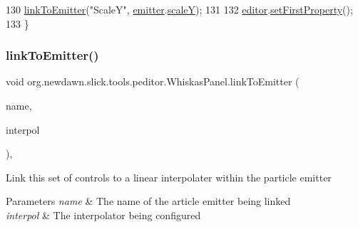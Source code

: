 \begin{DoxyCode}
130         \mbox{\hyperlink{classorg_1_1newdawn_1_1slick_1_1tools_1_1peditor_1_1_whiskas_panel_aa8fd4ce760ea12d13153842f6dc4c902}{linkToEmitter}}(\textcolor{stringliteral}{"ScaleY"}, \mbox{\hyperlink{classorg_1_1newdawn_1_1slick_1_1tools_1_1peditor_1_1_control_panel_aaa170169fa574cb6b271f782afcd2517}{emitter}}.\mbox{\hyperlink{classorg_1_1newdawn_1_1slick_1_1particles_1_1_configurable_emitter_a3053f632afced7caddded1c79bb75193}{scaleY}});
131 
132         \mbox{\hyperlink{classorg_1_1newdawn_1_1slick_1_1tools_1_1peditor_1_1_whiskas_panel_adafc0fc72d0d368d6298c3c44e4fa96c}{editor}}.\mbox{\hyperlink{classorg_1_1newdawn_1_1slick_1_1tools_1_1peditor_1_1_graph_editor_window_a0b37256a05613c6413adbe156255639b}{setFirstProperty}}();
133     \}
\end{DoxyCode}
\mbox{\label{classorg_1_1newdawn_1_1slick_1_1tools_1_1peditor_1_1_whiskas_panel_aa8fd4ce760ea12d13153842f6dc4c902}} 
\subsubsection{\texorpdfstring{link\+To\+Emitter()}{linkToEmitter()}}
{\footnotesize\ttfamily void org.\+newdawn.\+slick.\+tools.\+peditor.\+Whiskas\+Panel.\+link\+To\+Emitter (\begin{DoxyParamCaption}\item[{String}]{name,  }\item[{\mbox{\hyperlink{classorg_1_1newdawn_1_1slick_1_1particles_1_1_configurable_emitter_1_1_linear_interpolator}{Linear\+Interpolator}}}]{interpol }\end{DoxyParamCaption})\hspace{0.3cm}{\ttfamily [inline]}, {\ttfamily [private]}}

Link this set of controls to a linear interpolater within the particle emitter


\begin{DoxyParams}{Parameters}
{\em name} & The name of the article emitter being linked \\
\hline
{\em interpol} & The interpolator being configured \\
\hline
\end{DoxyParams}

